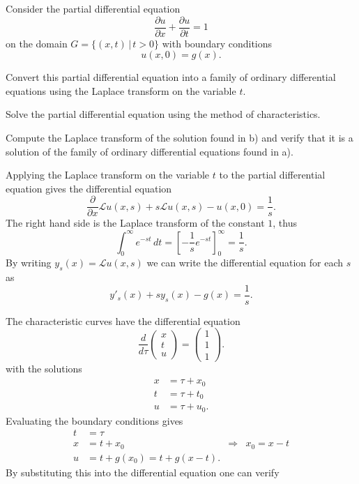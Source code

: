 Consider the partial differential equation
\[
\frac{\partial u}{\partial x}+\frac{\partial u}{\partial t}=1
\]
on the domain $G=\{ (x,t)\,|\,t>0\}$ with boundary conditions
\[
u(x,0)=g(x).
\]
\begin{teilaufgaben}
\item
Convert this partial differential equation into a family of ordinary
differential equations using the Laplace transform on the variable $t$.
\item
Solve the partial differential equation using the method of characteristics.
\item 
Compute the Laplace transform of the solution found in b) and verify
that it is a solution of the family of ordinary differential equations
found in a).
\end{teilaufgaben}

\begin{loesung}
\begin{teilaufgaben}
\item
Applying the Laplace transform on the variable $t$ to the partial
differential equation gives the differential equation
\[
\frac{\partial}{\partial x}\mathscr{L}u(x,s)
+s\mathscr{L}u(x,s)-u(x,0)=\frac1s.
\]
The right hand side is the Laplace transform of the constant $1$, thus
\[
\int_0^\infty e^{-st}\,dt
=
\left[
-\frac1s e^{-st}
\right]_0^\infty=\frac1s.
\]
By writing $y_s(x)=\mathscr{L}u(x,s)$ we can write the differential equation
for each $s$ as
\[
y'_s(x)+sy_s(x)-g(x)=\frac1s.
\]
\item
The characteristic curves have the differential equation
\[
\frac{d}{d\tau}\begin{pmatrix}
x\\t\\u
\end{pmatrix}
=\begin{pmatrix}
1\\1\\1
\end{pmatrix}.
\]
with the solutions
\begin{align*}
x&=\tau + x_0\\
t&=\tau + t_0\\
u&=\tau + u_0.
\end{align*}
Evaluating the boundary conditions gives
\begin{align*}
t&=\tau\\
x&=t+x_0
&\Rightarrow&x_0=x-t\\
u&=t+g(x_0)=t+g(x-t).
\end{align*}
By substituting this into the differential equation one can verify

\end{teilaufgaben}
\end{loesung}
